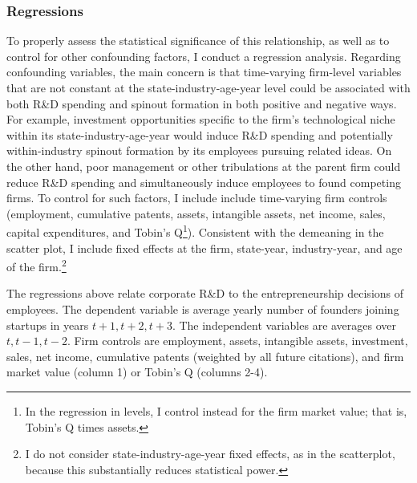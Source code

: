 \documentclass[ecta,nameyear,final]{econsocart}
\theoremstyle{plain}
\theoremstyle{remark}
\begin{document}
\subsubsection{Regressions}

To properly assess the statistical significance of this relationship, as well as to control for other confounding factors, I conduct a regression analysis. Regarding confounding variables, the main concern is that time-varying firm-level variables that are not constant at the state-industry-age-year level could be associated with both R\&D spending and spinout formation in both positive and negative ways. For example, investment opportunities specific to the firm's technological niche within its state-industry-age-year would induce R\&D spending and potentially within-industry spinout formation by its employees pursuing related ideas. On the other hand, poor management or other tribulations at the parent firm could reduce R\&D spending and simultaneously induce employees to found competing firms. To control for such factors, I include include time-varying firm controls (employment, cumulative patents, assets, intangible assets, net income, sales, capital expenditures, and Tobin's Q\footnote{In the regression in levels, I control instead for the firm market value; that is, Tobin's Q times assets.}). Consistent with the demeaning in the scatter plot, I include fixed effects at the firm, state-year, industry-year, and age of the firm.\footnote{I do not consider state-industry-age-year fixed effects, as in the scatterplot, because this substantially reduces statistical power.} 

\begin{table}[]
	\centering
	
	\caption{The regressions above relate corporate R\&D to the entrepreneurship decisions of employees. The dependent variable is average yearly number of founders joining startups in years $t+1,t+2,t+3$. The independent variables are averages over $t,t-1,t-2$. Firm controls are employment, assets, intangible assets, investment, sales, net income, cumulative patents (weighted by all future citations), and firm market value (column 1) or Tobin's Q (columns 2-4).}
	\label{table:RDandSpinoutFormation_headlingRegs}
\end{table}
\end{document}
